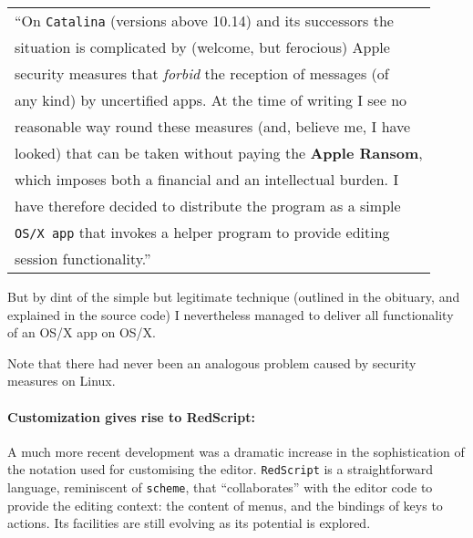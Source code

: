 \documentclass[12pt,a4paper]{article}
\begin{document}
\begin{longtable}[]{@{}l@{}}
\toprule
\endhead
``On \texttt{Catalina} (versions above 10.14) and its successors
the\tabularnewline
situation is complicated by (welcome, but ferocious)
Apple\tabularnewline
security measures that \emph{forbid} the reception of messages
(of\tabularnewline
any kind) by uncertified apps. At the time of writing I see
no\tabularnewline
reasonable way round these measures (and, believe me, I
have\tabularnewline
looked) that can be taken without paying the \textbf{Apple
Ransom},\tabularnewline
which imposes both a financial and an intellectual burden.
I\tabularnewline
have therefore decided to distribute the program as a
simple\tabularnewline
\texttt{OS/X\ app} that invokes a helper program to provide
editing\tabularnewline
session functionality.''\tabularnewline
\bottomrule
\end{longtable}

But by dint of the simple but legitimate technique (outlined in the
obituary, and explained in the source code) I nevertheless managed to
deliver all functionality of an OS/X app on OS/X.

Note that there had never been an analogous problem caused by security
measures on Linux.

\hypertarget{customization-gives-rise-to-redscript}{%
\paragraph{Customization gives rise to
RedScript:}\label{customization-gives-rise-to-redscript}}

A much more recent development was a dramatic increase in the
sophistication of the notation used for customising the editor.
\texttt{RedScript} is a straightforward language, reminiscent of
\texttt{scheme}, that ``collaborates'' with the editor code to provide
the editing context: the content of menus, and the bindings of keys to
actions. Its facilities are still evolving as its potential is explored.
\end{document}
